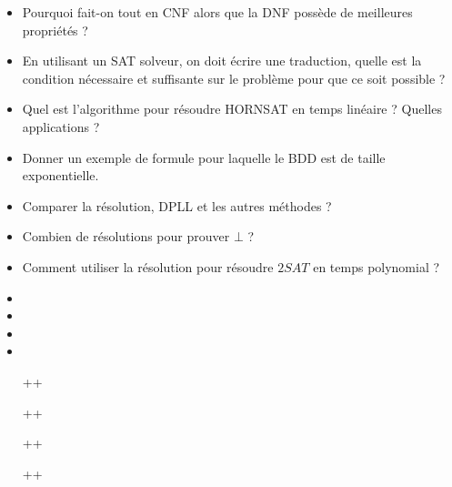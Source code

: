 \documentclass{agregfiche}
\begin{document}
\begin{itemize}
    \item Pourquoi fait-on tout en CNF alors que la DNF possède de meilleures
      propriétés ?
    \item En utilisant un SAT solveur, on doit écrire une traduction, quelle
        est la condition nécessaire et suffisante sur le problème pour que ce soit
        possible ?
    \item Quel est l'algorithme pour résoudre HORNSAT en temps linéaire ?
        Quelles applications ?
    \item Donner un exemple de formule pour laquelle le BDD est de
    taille
        exponentielle.
      \item Comparer la résolution, DPLL et les autres méthodes ?
      \item Combien de résolutions pour prouver $\bot$ ?
      \item Comment utiliser la résolution pour résoudre $2SAT$ en temps polynomial ?
\end{itemize}

\secreferences

\begin{itemize}
    \item 
    \item 
    \item 
    \item 

\end{itemize}

\secdev

\begin{itemize}

\item[++] 
\item[++] 
\item[++] 
\item[++] 
\end{itemize}
\end{document}
